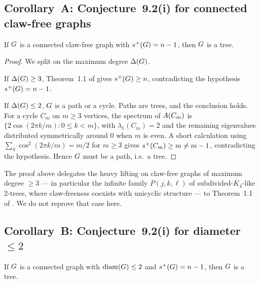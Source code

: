 \subsection{Corollary~A: Conjecture~9.2(i) for connected claw-free graphs}
\label{sec:notation:corA}

\begin{corollary}
\label{cor:A}
If $G$ is a connected claw-free graph with $s^{+}(G) = n - 1$,
then $G$ is a tree.
\end{corollary}

\begin{proof}
We split on the maximum degree $\Delta(G)$.

If $\Delta(G) \ge 3$, Theorem~1.1 of \cite{AKMPZ2025} gives
$s^{+}(G) \ge n$, contradicting the hypothesis
$s^{+}(G) = n - 1$.

If $\Delta(G) \le 2$, $G$ is a path or a cycle. Paths are
trees, and the conclusion holds. For a cycle $C_{m}$ on $m \ge 3$
vertices, the spectrum of $A(C_{m})$ is
$\{2 \cos(2\pi k / m) : 0 \le k < m\}$, with $\lambda_{1}(C_{m}) = 2$
and the remaining eigenvalues distributed symmetrically around $0$
when $m$ is even. A short calculation using
$\sum_{k} \cos^{2}(2\pi k / m) = m/2$ for $m \ge 3$ gives
$s^{+}(C_{m}) \ge m \ne m - 1$, contradicting the hypothesis. Hence
$G$ must be a path, i.e.\ a tree.
\end{proof}

\begin{remark}\label{rem:Pjkl}
The proof above delegates the heavy lifting on claw-free graphs of
maximum degree $\ge 3$ — in particular the infinite family
$P(j, k, \ell)$ of subdivided-$K_{4}$-like 2-trees, where claw-freeness
coexists with unicyclic structure — to Theorem~1.1 of \cite{AKMPZ2025}.
We do not reprove that case here.
\end{remark}

\subsection{Corollary~B: Conjecture~9.2(i) for diameter $\le 2$}
\label{sec:notation:corB}

\begin{corollary}
\label{cor:B}
If $G$ is a connected graph with $\operatorname{diam}(G) \le 2$ and
$s^{+}(G) = n - 1$, then $G$ is a tree.
\end{corollary}

